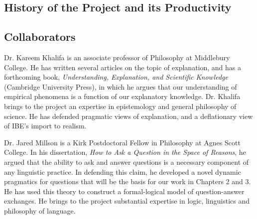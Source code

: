 \documentclass{article}[11pt]
\begin{document}
\subsection{History of the Project and its Productivity}


\subsection*{Collaborators}


Dr. Kareem Khalifa is an associate professor of Philosophy at Middlebury College. He has written several articles on the topic of explanation, and has a forthcoming book, \textit{Understanding, Explanation, and Scientific Knowledge} (Cambridge University Press), in which he argues that our understanding of empirical phenomena is a function of our explanatory knowledge. Dr. Khalifa brings to the project an expertise in epistemology and general philosophy of science. He has defended pragmatic views of explanation, and a deflationary view of IBE's import to realism.

Dr. Jared Millson is a Kirk Postdoctoral Fellow in Philosophy at Agnes Scott College. In his dissertation, \textit{How to Ask a Question in the Space of Reasons}, he argued that the ability to ask and answer questions is a necessary component of any linguistic practice. In defending this claim, he developed a novel dynamic pragmatics for questions that will be the basis for our work in Chapters 2 and 3. He has used this theory to construct a formal-logical model of question-answer exchanges. He brings to the project substantial expertise in logic, linguistics and philosophy of language.
\end{document}

